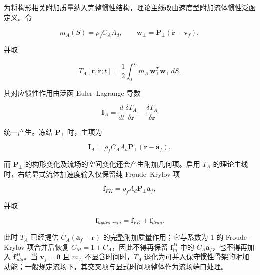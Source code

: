为将构形相关附加质量纳入完整惯性结构，理论主线改由速度型附加流体惯性泛函定义。令\cite{Newman1977MarineHydrodynamics,Faltinsen1990SeaLoads}

\begin{equation}
\label{eq:rod-1-56}
m_{A}(S) = \rho_{f}C_{A}A_{d},\quad\quad\mathbf{w}_{\bot} = \mathbf{P}_{\bot}\left( \dot{\mathbf{r}} - \mathbf{v}_{f} \right),
\end{equation}

并取

\begin{equation}
\label{eq:rod-1-57}
T_{A}\left\lbrack \mathbf{r},\dot{\mathbf{r}};t \right\rbrack = \frac{1}{2}\int_{0}^{L}m_{A}\,\mathbf{w}_{\bot}^{T}\mathbf{w}_{\bot}\, dS.
\end{equation}

其对应惯性作用由泛函 Euler--Lagrange 导数

\begin{equation}
\label{eq:rod-1-58}
\mathbf{I}_{A} = \frac{d}{dt}\frac{\delta T_{A}}{\delta\dot{\mathbf{r}}} - \frac{\delta T_{A}}{\delta\mathbf{r}}
\end{equation}

统一产生。冻结 \(\mathbf{P}_{\bot}\) 时，主项为

\begin{equation}
\label{eq:rod-1-59}
\mathbf{I}_{A} = \rho_{f}C_{A}A_{d}\mathbf{P}_{\bot}\left( \ddot{\mathbf{r}} - \mathbf{a}_{f} \right),
\end{equation}

而 \(\mathbf{P}_{\bot}\) 的构形变化及流场的空间变化还会产生附加几何项。启用 \(T_{A}\) 的理论主线时，右端显式流体加速度输入仅保留纯 Froude--Krylov 项

\begin{equation}
\label{eq:rod-1-60}
\boxed{\mathbf{f}_{FK} = \rho_{f}A_{d}\mathbf{P}_{\bot}\mathbf{a}_{f}},
\end{equation}

并取

\begin{equation}
\label{eq:rod-1-61}
\mathbf{f}_{hydro,rem} = \mathbf{f}_{FK} + \mathbf{f}_{drag}.
\end{equation}

此时 \(T_{A}\) 已经提供 \(C_{A}\left( \mathbf{a}_{f} - \ddot{\mathbf{r}} \right)\) 的完整附加质量作用；它与系数为 \(1\) 的 Froude--Krylov 项合并后恢复 \(C_{M} = 1 + C_{A}\)，因此不得再保留 \(\mathbf{f}_{in}^{M}\) 中的 \(C_{A}\mathbf{a}_{f}\)，也不得再加入 \(\mathbf{f}_{add}^{M}\)。当 \(\mathbf{v}_{f} = \mathbf{0}\) 且 \(m_{A}\) 不显含时间时，\(T_{A}\) 退化为可并入保守惯性骨架的附加动能；一般规定流场下，其交叉项与显式时间项整体作为流场端口处理。

